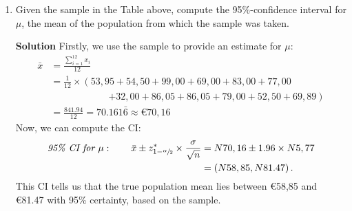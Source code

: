 \begin{enumerate}
\begin{enumerate}
        \item Given the sample in the Table above, compute the 95\%-confidence interval for $\mu$, the mean of the population from which the sample was taken.
        \begin{framed}{\textbf{Solution}}
        Firstly, we use the sample to provide an estimate for $\mu$:
        \begin{align}
            \bar{x} &= \frac{\sum_{i=1}^{12} x_i}{12} \\
            &= \frac{1}{12} \times \left(53,95 + 54,50 + 99,00 + 69,00 +83,00 + 77,00 \right. \\
            &{} \qquad {} \qquad {} \qquad \left. + 32,00 + 86,05 +86,05 + 79,00 + 52,50 + 69,89 \right) \\
            &= \frac{841.94}{12} = 70.161\bar{6} \approx \euro{70,16}
        \end{align}
        Now, we can compute the CI:
        \begin{align}
            \textit{95\% CI for } \mu : \qquad \bar{x} \pm z^*_{1 - \sfrac{\alpha}{2}} \times \frac{\sigma}{\sqrt{n}} &= \euro{70,16} \pm 1.96 \times \euro{5,77} \\
            &= \brac{\euro{58,85}, \euro{81.47}}.
        \end{align}
        This CI tells us that the true population mean lies between \euro{58,85} and \euro{81.47} with 95\% certainty, based on the sample.
        \end{framed}
        

\end{enumerate}
\end{enumerate}

